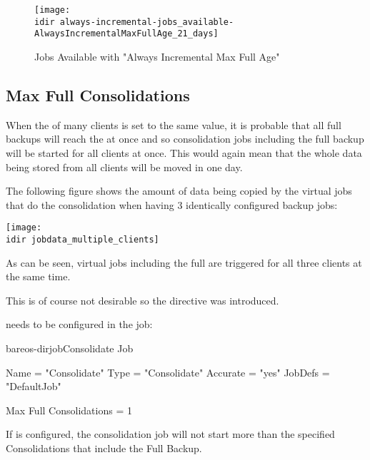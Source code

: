 \begin{figure}[htbp]
\centering
\texttt{[image: \\idir always-incremental-jobs\_available-AlwaysIncrementalMaxFullAge\_21\_days]}
\caption{Jobs Available with "Always Incremental Max Full Age"}
\end{figure}%

\subsection{Max Full Consolidations}
\label{sec:MaxFullConsolidations}

When the  of many clients is set to the same value,
it is probable that all full backups will reach the  at once
and so consolidation jobs including the full backup will be started for all clients at once.
This would again mean that the whole data being stored from all clients will be moved in one day.

The following figure shows the amount of data being copied by the virtual jobs that do the consolidation when having 3 identically configured backup jobs:

\begin{center}
\texttt{[image: \\idir jobdata\_multiple\_clients]}
\end{center}

As can be seen, virtual jobs including the full are triggered for all three clients at the same time.

This is of course not desirable so the directive  was introduced.

 needs to be configured in the  job:

\begin{bareosConfigResource}{bareos-dir}{job}{Consolidate}
Job {
    Name = "Consolidate"
    Type = "Consolidate"
    Accurate = "yes"
    JobDefs = "DefaultJob"

    Max Full Consolidations = 1
}
\end{bareosConfigResource}


If  is configured,
the consolidation job will not start more than the specified Consolidations that include the Full Backup.

